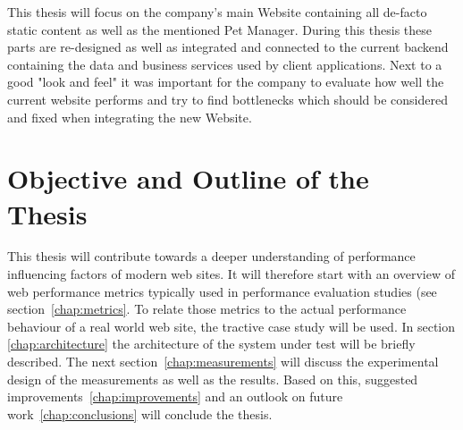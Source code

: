 This thesis will focus on the company's main Website containing all de-facto static content as well as the mentioned Pet Manager. During this thesis these parts are re-designed as well as integrated and connected to the current backend containing the data and business services used by client applications. Next to a good "look and feel" it was important for the company to evaluate how well the current website performs and try to find bottlenecks which should be considered and fixed when integrating the new Website.     

\section{Objective and Outline of the Thesis}

This thesis will contribute towards a deeper understanding of performance influencing factors of modern web sites.
It will therefore start with an overview of web performance metrics typically used in performance evaluation studies (see section~\ref{chap:metrics}.
To relate those metrics to the actual performance behaviour of a real world web site, the tractive case study will be used. 
In section \ref{chap:architecture} the architecture of the system under test will be briefly described.
The next section~\ref{chap:measurements} will discuss the  experimental design of the measurements as well as the results.
Based on this, suggested improvements~\ref{chap:improvements}  and an outlook on future work~\ref{chap:conclusions} will conclude the thesis. 


